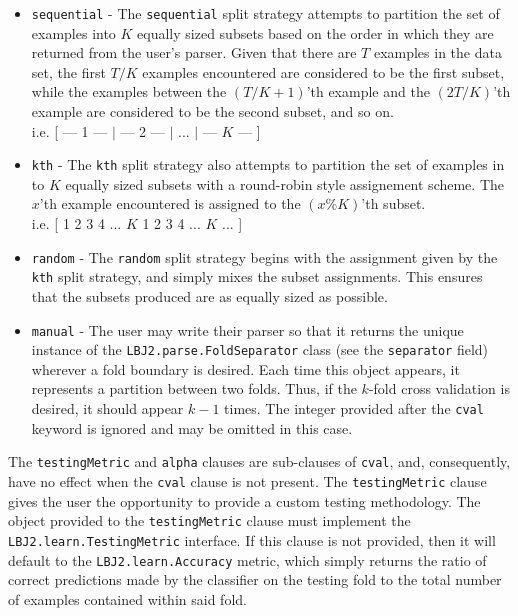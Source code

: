\begin{itemize}
\item {\tt sequential} -
  The {\tt sequential} split strategy attempts to partition the set of
  examples into $K$ equally sized subsets based on the order in which they are
  returned from the user's parser. Given that there are $T$ examples in the
  data set, the first $T/K$ examples encountered are considered to be the
  first subset, while the examples between the $(T/K+1)$'th example and the
  $(2T/K)$'th example are considered to be the second subset, and so on. \\
  i.e. [ --- 1 --- $|$ --- 2 --- $| $ ... $|$ --- $K$ --- ]

\item {\tt kth} -
  The {\tt kth} split strategy also attempts to partition the set of examples
  in to $K$ equally sized subsets with a round-robin style assignement scheme.
  The $x$'th example encountered is assigned to the $(x\%K)$'th subset. \\
  i.e. [ 1 2 3 4 ... $K$ 1 2 3 4 ... $K$ ... ]

\item {\tt random} -
  The {\tt random} split strategy begins with the assignment given by the
  {\tt kth} split strategy, and simply mixes the subset assignments. This
  ensures that the subsets produced are as equally sized as possible.

\item {\tt manual} -
  The user may write their parser so that it returns the unique instance of
  the {\tt LBJ2.parse.FoldSeparator} class (see the {\tt separator} field)
  wherever a fold boundary is desired.  Each time this object appears, it
  represents a partition between two folds.  Thus, if the $k$-fold cross
  validation is desired, it should appear $k-1$ times.  The integer provided
  after the {\tt cval} keyword is ignored and may be omitted in this case.

\end{itemize}

The {\tt testingMetric} and {\tt alpha} clauses are sub-clauses of {\tt cval},
and, consequently, have no effect when the {\tt cval} clause is not present.  The
{\tt testingMetric} clause gives the user the opportunity to provide a custom
testing methodology. The object provided to the {\tt testingMetric} clause
must implement the {\tt LBJ2.learn.TestingMetric} interface.  If this clause
is not provided, then it will default to the {\tt LBJ2.learn.Accuracy} metric,
which simply returns the ratio of correct predictions made by the classifier
on the testing fold to the total number of examples contained within said
fold.\\

